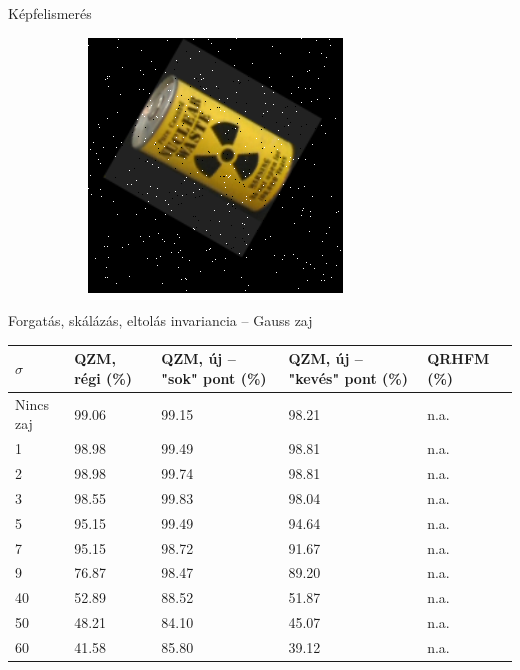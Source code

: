 \documentclass{beamer}
\begin{document}
\begin{frame}{Képfelismerés}
\begin{figure}[tbp]
\begin{subfigure}{0.25\textwidth}
    \includegraphics[width=\textwidth]{figures/noise/pepper1.png}
	\end{subfigure}
\end{figure}
\end{frame}

\begin{frame}{Forgatás, skálázás, eltolás invariancia -- Gauss zaj}
    \vskip 1cm
    \begin{table}[tbp]
        \centering
\begin{tabular}{|p{1.5cm}|p{1.5cm}|p{2cm}|p{2.1cm}|p{1.5cm}|} \hline
    $\sigma$ & \textbf{QZM, régi} (\%) & \textbf{QZM, új} -- "sok" pont (\%)& \textbf{QZM, új} -- "kevés" pont (\%) & \textbf{QRHFM} (\%) \\ \hline\hline
            Nincs zaj & 99.06 & 99.15 & 98.21 & n.a. \\ \hline
            1 & 98.98 & 99.49 & 98.81 & n.a. \\ \hline
            2 & 98.98 & 99.74 & 98.81 & n.a. \\ \hline
            3 & 98.55 & 99.83 & 98.04 & n.a. \\ \hline
            5 & 95.15 & 99.49 & 94.64 & n.a. \\ \hline
            7 & 95.15 & 98.72 & 91.67 & n.a. \\ \hline
            9 & 76.87 & 98.47 & 89.20 & n.a. \\ \hline
            40 & 52.89 & 88.52 & 51.87 & n.a. \\ \hline
            50 & 48.21 & 84.10 & 45.07 & n.a. \\ \hline
            60 & 41.58 & 85.80 & 39.12 & n.a. \\ \hline
        \end{tabular}
    \end{table}
\end{frame}
\end{document}
